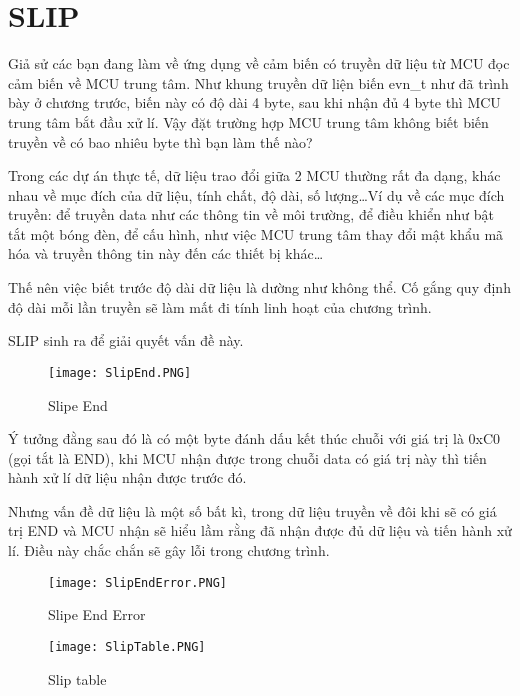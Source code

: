\newpage
\section{SLIP}

Giả sử các bạn đang làm về ứng dụng về cảm biến có truyền dữ liệu từ MCU đọc cảm biến về MCU trung tâm. Như khung truyền dữ liện biến evn\_t như đã trình bày ở chương trước, biến này có độ dài 4 byte, sau khi nhận đủ 4 byte thì MCU trung tâm bắt đầu xử lí. Vậy đặt trường hợp MCU trung tâm không biết biến truyền về có bao nhiêu byte thì bạn làm thế nào?

Trong các dự án thực tế, dữ liệu trao đổi giữa 2 MCU thường rất đa dạng, khác nhau về mục đích của dữ liệu, tính chất, độ dài, số lượng\dots Ví dụ về các mục đích truyền: để truyền data như các thông tin về môi trường, để điều khiển như bật tắt một bóng đèn, để cấu hình, như việc MCU trung tâm thay đổi mật khẩu mã hóa và truyền thông tin này đến các thiết bị khác\dots

Thế nên việc biết trước độ dài dữ liệu là dường như không thể. Cố gắng quy định độ dài mỗi lần truyền sẽ làm mất đi tính linh hoạt của chương trình. 

SLIP sinh ra để giải quyết vấn đề này.

\begin{wrapfigure}{l}{0.5\textwidth}
	\centering
    \texttt{[image: SlipEnd.PNG]}
\caption{Slipe End}
\end{wrapfigure}

Ý tưởng đằng sau đó là có một byte đánh dấu kết thúc chuỗi với giá trị là 0xC0 (gọi tắt là END), khi MCU nhận được trong chuỗi data có giá trị này thì tiến hành xử lí dữ liệu nhận được trước đó.

Nhưng vấn đề dữ liệu là một số bất kì, trong dữ liệu truyền về đôi khi sẽ có giá trị END và MCU nhận sẽ hiểu lầm rằng đã nhận được đủ dữ liệu và tiến hành xử lí. Điều này chắc chắn sẽ gây lỗi trong chương trình.

\begin{wrapfigure}{l}{0.5\textwidth}
	\centering
    \texttt{[image: SlipEndError.PNG]}
\caption{Slipe End Error}
\end{wrapfigure}

\begin{wrapfigure}{l}{0.5\textwidth}
	\centering
    \texttt{[image: SlipTable.PNG]}
    \caption{Slip table}
    \label{SlipTable}
\end{wrapfigure}

